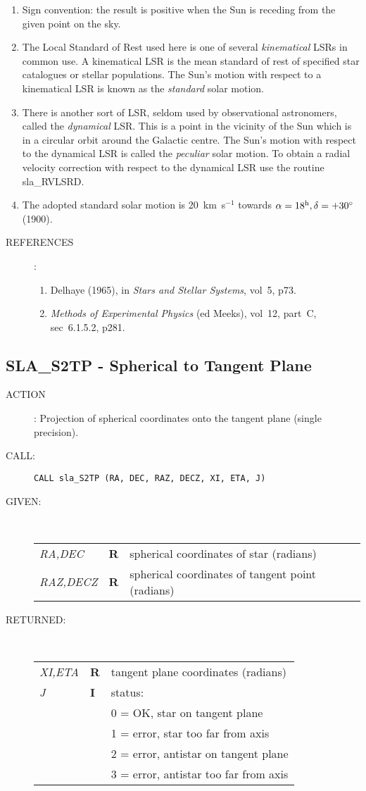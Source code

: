 \documentclass[11pt,twoside]{article}
\newcommand{\xlabel}[1]{}
\newcommand{\routine}[3]
{\hbadness=10000
  \vbox
  {
    \rule{\textwidth}{0.3mm}\\
    {\Large {\bf #1} \hfill #2 \hfill {\bf #1}}\\
    \setlength{\oldspacing}{\topsep}
    \setlength{\topsep}{0.3ex}
    \begin{description}
      #3
    \end{description}
    \setlength{\topsep}{\oldspacing}
  }
}
\renewcommand{\routine}[3]
   {
      \subsection{#1\xlabel{#1} - #2\label{#1}}
       \begin{description}
         #3
       \end{description}
   }
\newcommand{\action}[1]
{\item[ACTION]: #1}
\newcommand{\action}[1]
   {\item[ACTION:] #1}
\newcommand{\call}[1]
{\item[CALL]: \hspace{0.4em}{\tt #1}}
\newlength{\oldspacing}
\renewcommand{\call}[1]
   {
    \item[CALL:] {\tt #1}
   }
\newcommand{\args}[2]
{
  \goodbreak
  \setlength{\oldspacing}{\topsep}
  \setlength{\topsep}{0.3ex}
  \begin{description}
  \item[#1]:\\[1.5ex]
    \begin{tabular}{p{7em}p{6em}p{22em}}
      #2
    \end{tabular}
  \end{description}
  \setlength{\topsep}{\oldspacing}
}
\renewcommand{\args}[2]
   {
     \begin{description}
        \item[#1:]\\
        \begin{tabular}{p{7em}p{6em}l}
           #2
        \end{tabular}
     \end{description}
   }
\newcommand{\spec}[3]
{
  {\em {#1}} & {\bf \mbox{#2}} & {#3}
}
\newcommand{\refs}[1]
{
  \goodbreak
  \setlength{\oldspacing}{\topsep}
  \setlength{\topsep}{0.3ex}
  \begin{description}
    \item[REFERENCES]:
        #1
  \end{description}
  \setlength{\topsep}{\oldspacing}
}
\newcommand{\refs}[1]
   {
     \begin{description}
       \item[REFERENCES:]
           #1
     \end{description}
   }
\begin{document}
{
 \begin{enumerate}
  \item Sign convention: the result is positive when
        the Sun is receding from the given point on the sky.
  \item The Local Standard of Rest used here is one of several
        {\it kinematical}\/ LSRs in common use.  A kinematical LSR is the
        mean standard of rest of specified star catalogues or stellar
        populations.  The Sun's motion with respect to a kinematical
        LSR is known as the {\it standard}\/ solar motion.
  \item There is another sort of LSR, seldom used by observational
        astronomers, called the {\it dynamical}\/ LSR.  This is a
        point in the vicinity of the Sun which is in a circular orbit
        around the Galactic centre.  The Sun's motion with respect to
        the dynamical LSR is called the {\it peculiar}\/ solar motion.  To
        obtain a radial velocity correction with respect to the
        dynamical LSR use the routine sla\_RVLSRD.
  \item The adopted standard solar motion is 20~km~s$^{-1}$
        towards $\alpha=18^{\rm h},\delta=+30^{\circ}$ (1900).
 \end{enumerate}
}
\refs
{
 \begin{enumerate}
  \item Delhaye (1965), in {\it Stars and Stellar Systems}, vol~5, p73.
  \item {\it Methods of Experimental Physics}\/ (ed Meeks), vol~12,
        part~C, sec~6.1.5.2, p281.
 \end{enumerate}
}
\routine{SLA\_S2TP}{Spherical to Tangent Plane}
{
 \action{Projection of spherical coordinates onto the tangent plane
         (single precision).}
 \call{CALL sla\_S2TP (RA, DEC, RAZ, DECZ, XI, ETA, J)}
}
\args{GIVEN}
{
 \spec{RA,DEC}{R}{spherical coordinates of star (radians)} \\
 \spec{RAZ,DECZ}{R}{spherical coordinates of tangent point (radians)}
}
\args{RETURNED}
{
 \spec{XI,ETA}{R}{tangent plane coordinates (radians)} \\
 \spec{J}{I}{status:} \\
 \spec{}{}{\hspace{1.5em} 0 = OK, star on tangent plane} \\
 \spec{}{}{\hspace{1.5em} 1 = error, star too far from axis} \\
 \spec{}{}{\hspace{1.5em} 2 = error, antistar on tangent plane} \\
 \spec{}{}{\hspace{1.5em} 3 = error, antistar too far from axis}
}
\end{document}
